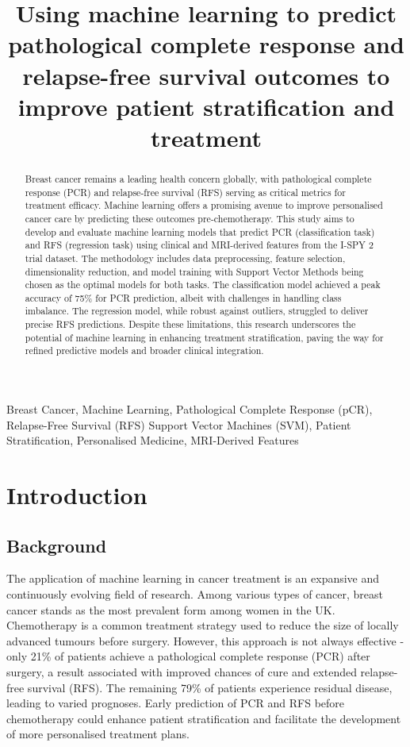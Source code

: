 \documentclass{article}
\title{
  Using machine learning to predict pathological complete response and relapse-free survival outcomes to improve patient stratification and treatment}
\begin{document}
%
\maketitle
%
\begin{abstract}
  Breast cancer remains a leading health concern globally, with pathological complete response (PCR) and relapse-free survival (RFS) serving as critical metrics for treatment efficacy. Machine learning offers a promising avenue to improve personalised cancer care by predicting these outcomes pre-chemotherapy. This study aims to develop and evaluate machine learning models that predict PCR (classification task) and RFS (regression task) using clinical and MRI-derived features from the I-SPY 2 trial dataset. The methodology includes data preprocessing, feature selection, dimensionality reduction, and model training with Support Vector Methods being chosen as the optimal models for both tasks. The classification model achieved a peak accuracy of 75\% for PCR prediction, albeit with challenges in handling class imbalance. The regression model, while robust against outliers, struggled to deliver precise RFS predictions. Despite these limitations, this research underscores the potential of machine learning in enhancing treatment stratification, paving the way for refined predictive models and broader clinical integration.
\end{abstract}
%
\begin{keywords}
  Breast Cancer, Machine Learning, Pathological Complete Response (pCR), Relapse-Free Survival (RFS)
  Support Vector Machines (SVM), Patient Stratification, Personalised Medicine, MRI-Derived Features
\end{keywords}
%
\section{Introduction}
\subsection{Background}

The application of machine learning in cancer treatment is an expansive and continuously evolving field of research. Among various types of cancer, breast cancer stands as the most prevalent form among women in the UK. Chemotherapy is a common treatment strategy used to reduce the size of locally advanced tumours before surgery. However, this approach is not always effective -  only 21\% of patients achieve a pathological complete response (PCR) after surgery,  a result associated with improved chances of cure and extended relapse-free survival (RFS). The remaining 79\% of patients experience residual disease, leading to varied prognoses\cite{spring2020pathologic}. Early prediction of PCR and RFS before chemotherapy could  enhance patient stratification and facilitate the development of more personalised treatment plans.
\end{document}
